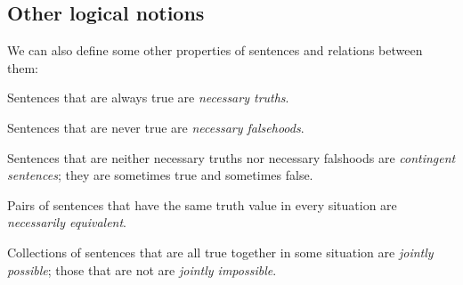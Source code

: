 \subsection{Other logical notions} \cite[][Chapter 3, pp. 18-25]{Mag25}

We can also define some other properties of sentences and relations between them:

\begin{argument}
\item[] Sentences that are always true are \textit{necessary truths}.
\item[] Sentences that are never true are \textit{necessary falsehoods}.
\item[] Sentences that are neither necessary truths nor necessary falshoods are
  \textit{contingent sentences}; they are sometimes true and sometimes false.
\item[] Pairs of sentences that have the same truth value in every situation are \textit{necessarily equivalent}.
\item[] Collections of sentences that are all true together in some situation are \textit{jointly possible};
  those that are not are \textit{jointly impossible}.
\end{argument}

